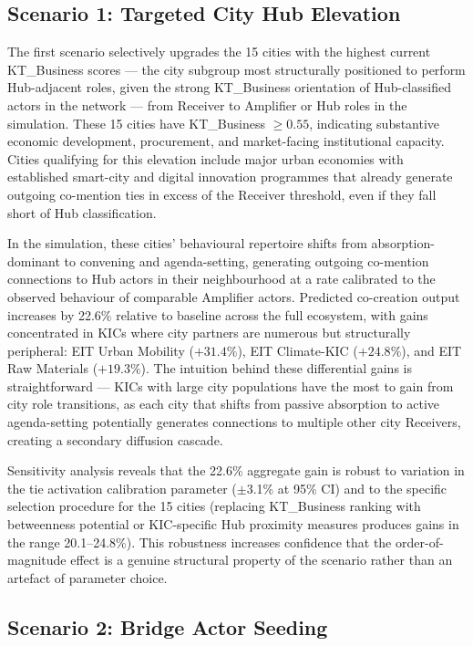 \documentclass[review,12pt]{elsarticle}
\begin{document}
\subsection{Scenario 1: Targeted City Hub Elevation}

The first scenario selectively upgrades the 15 cities with the highest current KT\_Business scores --- the city subgroup most structurally positioned to perform Hub-adjacent roles, given the strong KT\_Business orientation of Hub-classified actors in the network --- from Receiver to Amplifier or Hub roles in the simulation. These 15 cities have KT\_Business $\geq 0.55$, indicating substantive economic development, procurement, and market-facing institutional capacity. Cities qualifying for this elevation include major urban economies with established smart-city and digital innovation programmes that already generate outgoing co-mention ties in excess of the Receiver threshold, even if they fall short of Hub classification.

In the simulation, these cities' behavioural repertoire shifts from absorption-dominant to convening and agenda-setting, generating outgoing co-mention connections to Hub actors in their neighbourhood at a rate calibrated to the observed behaviour of comparable Amplifier actors. Predicted co-creation output increases by 22.6\% relative to baseline across the full ecosystem, with gains concentrated in KICs where city partners are numerous but structurally peripheral: EIT Urban Mobility ($+31.4\%$), EIT Climate-KIC ($+24.8\%$), and EIT Raw Materials ($+19.3\%$). The intuition behind these differential gains is straightforward --- KICs with large city populations have the most to gain from city role transitions, as each city that shifts from passive absorption to active agenda-setting potentially generates connections to multiple other city Receivers, creating a secondary diffusion cascade.

Sensitivity analysis reveals that the 22.6\% aggregate gain is robust to variation in the tie activation calibration parameter ($\pm$3.1\% at 95\% CI) and to the specific selection procedure for the 15 cities (replacing KT\_Business ranking with betweenness potential or KIC-specific Hub proximity measures produces gains in the range 20.1--24.8\%). This robustness increases confidence that the order-of-magnitude effect is a genuine structural property of the scenario rather than an artefact of parameter choice.

\subsection{Scenario 2: Bridge Actor Seeding}
\end{document}
